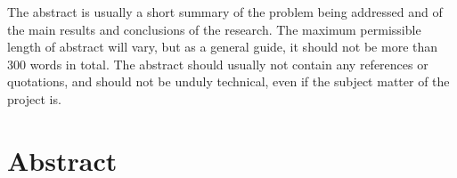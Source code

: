 The abstract is usually a short summary of the problem being addressed and of the main results and conclusions of the research. The maximum permissible length of abstract will vary, but as a general guide, it should not be more than 300 words in total. The abstract should usually not contain any references or quotations, and should not be unduly technical, even if the subject matter of the project is.

\chapter{Abstract}


